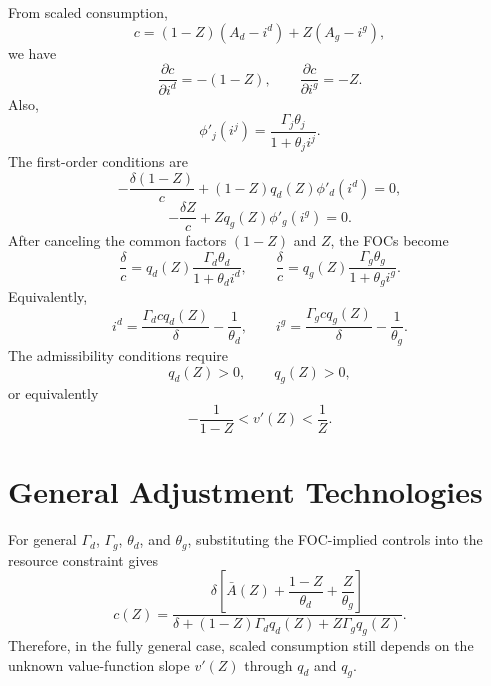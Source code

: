 \documentclass[11pt]{article}
\newcommand{\Abar}{\bar A}
\begin{document}
From scaled consumption,
\begin{equation}
    c=(1-Z)(A_d-i^d)+Z(A_g-i^g),
\end{equation}
we have
\begin{equation}
    \frac{\partial c}{\partial i^d}=-(1-Z),
    \qquad
    \frac{\partial c}{\partial i^g}=-Z.
\end{equation}
Also,
\begin{equation}
    \phi'_j(i^j)=\frac{\Gamma_j\theta_j}{1+\theta_j i^j}.
\end{equation}
The first-order conditions are
\begin{equation}
    -\frac{\delta(1-Z)}{c}
    +(1-Z)q_d(Z)\phi'_d(i^d)=0,
\end{equation}
\begin{equation}
    -\frac{\delta Z}{c}
    +Zq_g(Z)\phi'_g(i^g)=0.
\end{equation}
After canceling the common factors $(1-Z)$ and $Z$, the FOCs become
\begin{equation}
    \boxed{
    \frac{\delta}{c}
    =
    q_d(Z)\frac{\Gamma_d\theta_d}{1+\theta_d i^d},
    \qquad
    \frac{\delta}{c}
    =
    q_g(Z)\frac{\Gamma_g\theta_g}{1+\theta_g i^g}.
    }
\end{equation}
Equivalently,
\begin{equation}
    \boxed{
    i^d
    =
    \frac{\Gamma_d c q_d(Z)}{\delta}-\frac{1}{\theta_d},
    \qquad
    i^g
    =
    \frac{\Gamma_g c q_g(Z)}{\delta}-\frac{1}{\theta_g}.
    }
\end{equation}
The admissibility conditions require
\begin{equation}
    q_d(Z)>0,
    \qquad
    q_g(Z)>0,
\end{equation}
or equivalently
\begin{equation}
    -\frac{1}{1-Z}<v'(Z)<\frac{1}{Z}.
\end{equation}

\section{General Adjustment Technologies}

For general $\Gamma_d$, $\Gamma_g$, $\theta_d$, and $\theta_g$, substituting the FOC-implied controls into the resource constraint gives
\begin{equation}
    \boxed{
    c(Z)
    =
    \frac{
    \delta\left[\Abar(Z)+\dfrac{1-Z}{\theta_d}+\dfrac{Z}{\theta_g}\right]
    }{
    \delta+(1-Z)\Gamma_d q_d(Z)+Z\Gamma_g q_g(Z)
    }.
    }
\end{equation}
Therefore, in the fully general case, scaled consumption still depends on the unknown value-function slope $v'(Z)$ through $q_d$ and $q_g$.
\end{document}
